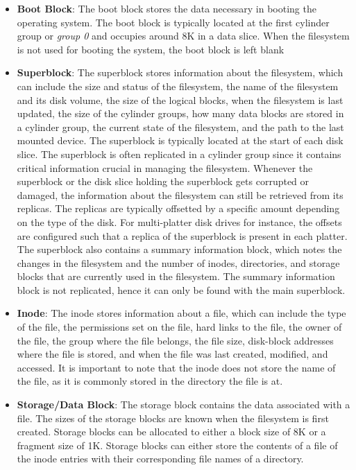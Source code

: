 \begin{itemize}
	\item \textbf{Boot Block}: The boot block stores the data necessary in booting the operating system.
	      The boot block is typically located at the first cylinder group or \textit{group 0} and occupies around 8K in
	      a data slice. When the filesystem is not used for booting the system, the boot block is left blank

	\item \textbf{Superblock}: The superblock stores information about the filesystem, which can include the size and
	      status of the filesystem, the name of the filesystem and its disk volume, the size of the logical blocks, when the
	      filesystem is last updated, the size of the cylinder groups, how many data blocks are stored in a cylinder group,
	      the current state of the filesystem, and the path to the last mounted device. The superblock is typically located
	      at the start of each disk slice. The superblock is often replicated in a cylinder group since it contains critical
	      information crucial in managing the filesystem. Whenever the superblock or the disk slice holding the superblock
	      gets corrupted or damaged, the information about the filesystem can still be retrieved from its replicas.
	      The replicas are typically offsetted by a specific amount depending on the type of the disk. For multi-platter disk
	      drives for instance, the offsets are configured such that a replica of the superblock is present in each platter.
	      The superblock also contains a summary information block, which notes the changes in the filesystem and the number
	      of inodes, directories, and storage blocks that are currently used in the filesystem. The summary information
	      block is not replicated, hence it can only be found with the main superblock.

	\item \textbf{Inode}: The inode stores information about a file, which can include the type of the file, the
	      permissions set on the file, hard links to the file, the owner of the file, the group where the file belongs,
	      the file size, disk-block addresses where the file is stored, and when the file was last created, modified,
	      and accessed. It is important to note that the inode does not store the name of the file, as it is commonly
	      stored in the directory the file is at.

	\item \textbf{Storage/Data Block}: The storage block contains the data associated with a file. The sizes of the
	      storage blocks are known when the filesystem is first created. Storage blocks can be allocated to either a block
	      size of 8K or a fragment size of 1K. Storage blocks can either store the contents of a file of the inode
	      entries with their corresponding file names of a directory.
\end{itemize}

